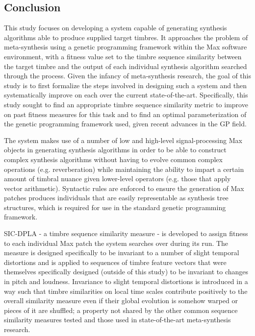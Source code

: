 \documentclass[a4paper,12pt]{report} 	%
\numberwithin{figure}{chapter}
\numberwithin{table}{chapter}
\numberwithin{equation}{chapter}
\begin{document}
\begin{flushleft}
\vspace*{\QuarterPage}
\chapter{Conclusion} %
This study focuses on developing a system capable of generating synthesis algorithms able to produce supplied target timbres. It approaches the problem of meta-synthesis using a genetic programming framework within the Max software environment, with a fitness value set to the timbre sequence similarity between the target timbre and the output of each individual synthesis algorithm searched through the process. Given the infancy of meta-synthesis research, the goal of this study is to first formalize the steps involved in designing such a system and then systematically improve on each over the current state-of-the-art. Specifically, this study sought to find an appropriate timbre sequence similarity metric to improve on past fitness measures for this task and to find an optimal parameterization of the genetic programming framework used, given recent advances in the GP field.

The system makes use of a number of low and high-level signal-processing Max objects in generating synthesis algorithms in order to be able to construct complex synthesis algorithms without having to evolve common complex operations (e.g. reverberation) while maintaining the ability to impart a certain amount of timbral nuance given lower-level operators (e.g. those that apply vector arithmetic). Syntactic rules are enforced to ensure the generation of Max patches produces individuals that are easily representable as synthesis tree structures, which is required for use in the standard genetic programming framework.

SIC-DPLA - a timbre sequence similarity measure - is developed to assign fitness to each individual Max patch the system searches over during its run. The measure is designed specifically to be invariant to a number of slight temporal distortions and is applied to sequences of timbre feature vectors that were themselves specifically designed (outside of this study) to be invariant to changes in pitch and loudness. Invariance to slight temporal distortions is introduced in a way such that timbre similarities on local time scales contribute positively to the overall similarity measure even if their global evolution is somehow warped or pieces of it are shuffled; a property not shared by the other common sequence similarity measures tested and those used in state-of-the-art meta-synthesis research.


\end{flushleft}
\end{document}
